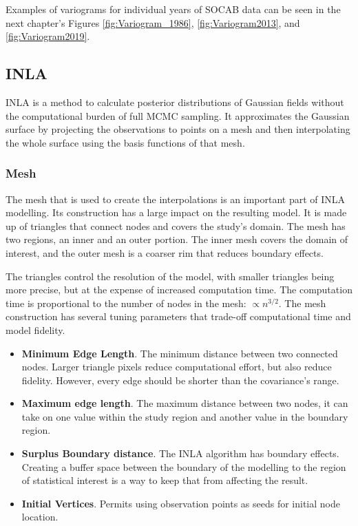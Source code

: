\documentclass{article}
\begin{document}
Examples of variograms for individual years of \ac{SOCAB} data can be seen in the next chapter's Figures \ref{fig:Variogram_1986}, \ref{fig:Variogram2013}, and \ref{fig:Variogram2019}.


\subsection{INLA}
\label{subsec:inla}
\ac{INLA} is a method to calculate posterior distributions of Gaussian fields without the computational burden of full \ac{MCMC} sampling. It approximates the Gaussian surface by projecting the observations to points on a mesh and then interpolating the whole surface using the basis functions of that mesh.

\subsubsection*{Mesh} \label{subsec:IntroMesh}
The mesh that is used to create the interpolations is an important part of \ac{INLA} modelling.  Its construction has a large impact on the resulting model.  It is made up of triangles that connect nodes and covers the study's domain.
The mesh has two regions, an inner and an outer portion.  The inner mesh covers the domain of interest, and the outer mesh is a coarser rim that reduces boundary effects.  

The triangles control the resolution of the model, with smaller triangles being more precise, but at the expense of increased computation time.  The computation time is proportional to the number of nodes in the mesh: $\propto n^{3/2}$.  The mesh construction has several tuning parameters that trade-off computational time and model fidelity.
    
\begin{itemize}
    \item \textbf{Minimum Edge Length}.  The minimum distance between two connected nodes. Larger triangle pixels reduce computational effort, but also reduce fidelity.  However, every edge should be shorter than the covariance's range.
    \item \textbf{Maximum edge length}.  The maximum distance between two nodes, it can take on one value within the study region and another value in the boundary region. 
    \item \textbf{Surplus Boundary distance}.  The \ac{INLA} algorithm has boundary effects.  Creating a buffer space between the boundary of the modelling to the region of statistical interest is a way to keep that from affecting the result.
    \item \textbf{Initial Vertices}. Permits using observation points as seeds for initial node location.
\end{itemize}
\end{document}
